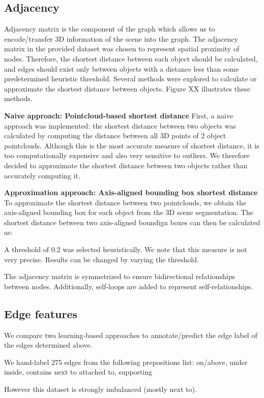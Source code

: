 \subsection{Adjacency}
Adjacency matrix is the component of the graph which allows us to encode/transfer 3D information of the scene into the graph. The adjacency matrix in the provided dataset was chosen to represent spatial proximity of nodes. Therefore, the shortest distance between each object should be calculated, and edges should exist only between objects with a distance less than some predetermined heuristic threshold. Several methods were explored to calculate or approximate the shortest distance between objects.
Figure XX illustrates these methods.

\bigskip
\noindent
\textbf{Naive approach: Pointcloud-based shortest distance}
First, a naive approach was implemented: the shortest distance between two objects was calculated by computing the distance between all 3D points of 2 object pointclouds. Although this is the most accurate measure of shortest distance, it is too computationally expensive and also very sensitive to outliers. We therefore decided to approximate the shortest distance between two objects rather than accurately computing it.

\bigskip
\noindent
\textbf{Approximation approach: Axis-aligned bounding box shortest distance}
To approximate the shortest distance between two pointclouds, we obtain the axis-aligned bounding box for each object from the 3D scene segmentation. The shortest distance between two axis-aligned boundign boxes can then be calculated as:


A threshold of 0.2 was selected heuristically. We note that this measure is not very precise. Results can be changed by varying the threshold.

The adjacency matrix is symmetrized to ensure bidirectional relationships between nodes. Additionally, self-loops are added to represent self-relationships.

\subsection{Edge features}
We compare two learning-based approaches to annotate/predict the edge label of the edges determined above.

We hand-label 275 edges from the following prepositions list:
on/above, under
inside, contains
next to
attached to, supporting

However this dataset is strongly imbalanced (mostly next to). 

